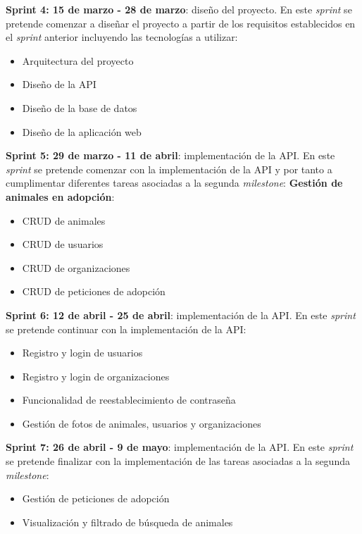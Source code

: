 \textbf{Sprint 4: 15 de marzo - 28 de marzo}: diseño del proyecto. En este \textit{sprint} se pretende comenzar a
diseñar el proyecto a partir de los requisitos establecidos en el \textit{sprint} anterior incluyendo las
tecnologías a utilizar:

\begin{itemize}
    \item Arquitectura del proyecto
    \item Diseño de la API
    \item Diseño de la base de datos
    \item Diseño de la aplicación web
\end{itemize}

\textbf{Sprint 5: 29 de marzo - 11 de abril}: implementación de la API. En este \textit{sprint} se pretende comenzar
con la implementación de la API y por tanto a cumplimentar diferentes tareas asociadas a la segunda \textit{milestone}:
\textbf{Gestión de animales en adopción}:

\begin{itemize}
    \item CRUD de animales
    \item CRUD de usuarios
    \item CRUD de organizaciones
    \item CRUD de peticiones de adopción
\end{itemize}

\textbf{Sprint 6: 12 de abril - 25 de abril}: implementación de la API. En este \textit{sprint} se pretende continuar
con la implementación de la API:

\begin{itemize}
    \item Registro y login de usuarios
    \item Registro y login de organizaciones
    \item Funcionalidad de reestablecimiento de contraseña
    \item Gestión de fotos de animales, usuarios y organizaciones
\end{itemize}

\textbf{Sprint 7: 26 de abril - 9 de mayo}: implementación de la API. En este \textit{sprint} se pretende finalizar
con la implementación de las tareas asociadas a la segunda \textit{milestone}:

\begin{itemize}
    \item Gestión de peticiones de adopción
    \item Visualización y filtrado de búsqueda de animales
\end{itemize}

